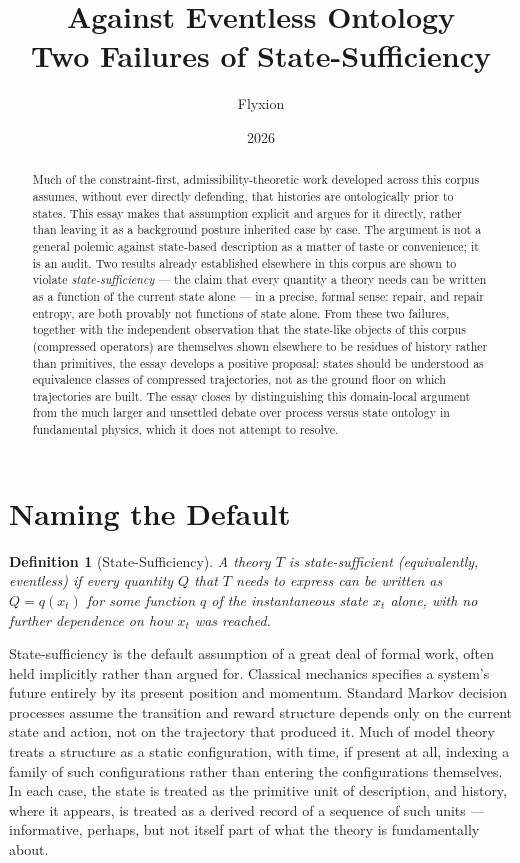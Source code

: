 \documentclass[11pt]{article}
\title{\textbf{Against Eventless Ontology}\\[4pt]
\large Two Failures of State-Sufficiency}
\author{Flyxion}
\date{2026}
\newtheorem{definition}{Definition}[section]
\begin{document}
\maketitle

\begin{abstract}
Much of the constraint-first, admissibility-theoretic work developed across this corpus assumes, without ever directly defending, that histories are ontologically prior to states. This essay makes that assumption explicit and argues for it directly, rather than leaving it as a background posture inherited case by case. The argument is not a general polemic against state-based description as a matter of taste or convenience; it is an audit. Two results already established elsewhere in this corpus are shown to violate \emph{state-sufficiency} — the claim that every quantity a theory needs can be written as a function of the current state alone — in a precise, formal sense: repair, and repair entropy, are both provably not functions of state alone. From these two failures, together with the independent observation that the state-like objects of this corpus (compressed operators) are themselves shown elsewhere to be residues of history rather than primitives, the essay develops a positive proposal: states should be understood as equivalence classes of compressed trajectories, not as the ground floor on which trajectories are built. The essay closes by distinguishing this domain-local argument from the much larger and unsettled debate over process versus state ontology in fundamental physics, which it does not attempt to resolve.
\end{abstract}

\section{Naming the Default}

\begin{definition}[State-Sufficiency]
A theory $T$ is \emph{state-sufficient} (equivalently, \emph{eventless}) if every quantity $Q$ that $T$ needs to express can be written as $Q = q(x_t)$ for some function $q$ of the instantaneous state $x_t$ alone, with no further dependence on how $x_t$ was reached.
\end{definition}

State-sufficiency is the default assumption of a great deal of formal work, often held implicitly rather than argued for. Classical mechanics specifies a system's future entirely by its present position and momentum. Standard Markov decision processes assume the transition and reward structure depends only on the current state and action, not on the trajectory that produced it. Much of model theory treats a structure as a static configuration, with time, if present at all, indexing a family of such configurations rather than entering the configurations themselves. In each case, the state is treated as the primitive unit of description, and history, where it appears, is treated as a derived record of a sequence of such units — informative, perhaps, but not itself part of what the theory is fundamentally about.
\end{document}

